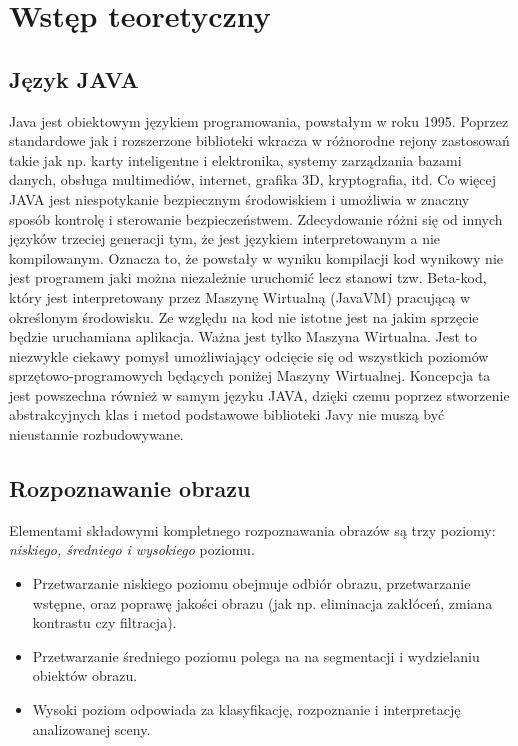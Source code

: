 \section{Wstęp teoretyczny}

\subsection{Język JAVA}
Java jest obiektowym językiem programowania, powstałym w roku 1995. Poprzez standardowe jak i rozszerzone biblioteki wkracza w różnorodne rejony zastosowań takie jak np. karty inteligentne i elektronika, systemy zarządzania bazami danych, obsługa multimediów, internet, grafika 3D, kryptografia, itd. Co więcej JAVA jest niespotykanie bezpiecznym środowiskiem i umożliwia w znaczny sposób kontrolę i sterowanie bezpieczeństwem. Zdecydowanie różni się od innych języków trzeciej generacji tym, że jest językiem interpretowanym a nie kompilowanym. Oznacza to, że powstały w wyniku kompilacji kod wynikowy nie jest programem jaki można niezależnie uruchomić lecz stanowi tzw. Beta-kod, który jest interpretowany przez Maszynę Wirtualną (JavaVM) pracującą w określonym środowisku. Ze względu na kod nie istotne jest na jakim sprzęcie będzie uruchamiana aplikacja. Ważna jest tylko Maszyna Wirtualna. Jest to niezwykle ciekawy pomysł umożliwiający odcięcie się od wszystkich poziomów sprzętowo-programowych będących poniżej Maszyny Wirtualnej. Koncepcja ta jest powszechna również w samym języku JAVA, dzięki czemu poprzez stworzenie abstrakcyjnych klas i metod podstawowe biblioteki Javy nie muszą być nieustannie rozbudowywane.

\subsection{Rozpoznawanie obrazu}
Elementami składowymi kompletnego rozpoznawania obrazów są trzy poziomy: \textit{niskiego, średniego i wysokiego} poziomu. 
\begin{itemize}
\item Przetwarzanie niskiego poziomu obejmuje odbiór obrazu, przetwarzanie wstępne, oraz poprawę jakości obrazu (jak np. eliminacja zakłóceń, zmiana kontrastu czy filtracja). 
\item Przetwarzanie średniego poziomu polega na na segmentacji i wydzielaniu obiektów obrazu. 
\item Wysoki poziom odpowiada za klasyfikację, rozpoznanie i interpretację analizowanej sceny.
\end{itemize}
\pagebreak[4]
